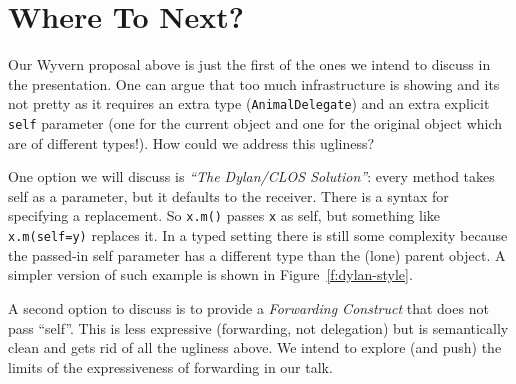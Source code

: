 \documentclass[preprint]{sigplanconf}
\begin{document}


\section{Where To Next?}



Our Wyvern proposal above is just the first of the ones we intend to discuss in the presentation. One can argue that too much infrastructure is showing and its not pretty as it requires an extra type (\texttt{AnimalDelegate}) and an extra explicit \texttt{self} parameter (one for the current object and one for the original object which are of different types!). How could we address this ugliness?

One option we will discuss is \textit{``The Dylan/CLOS Solution''}: every method takes self as a parameter, but it defaults to the receiver. There is a syntax for specifying a replacement. So \texttt{x.m()} passes \texttt{x} as self, but something like \texttt{x.m(self=y)} replaces it. In a typed setting there is still some complexity because the passed-in self parameter has a different type than the (lone) parent object. A simpler version of such example is shown in Figure~\ref{f:dylan-style}.

A second option to discuss is to provide a \textit{Forwarding Construct} that does not pass ``self''. This is less expressive (forwarding, not delegation) but is semantically clean and gets rid of all the ugliness above. We intend to explore (and push) the limits of the expressiveness of forwarding in our talk.

\end{document}
